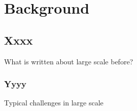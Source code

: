 
\chapter{Background}
\label{chapter:background}


\section{Xxxx}

What is written about large scale before?


\subsection{Yyyy}

Typical challenges in large scale
